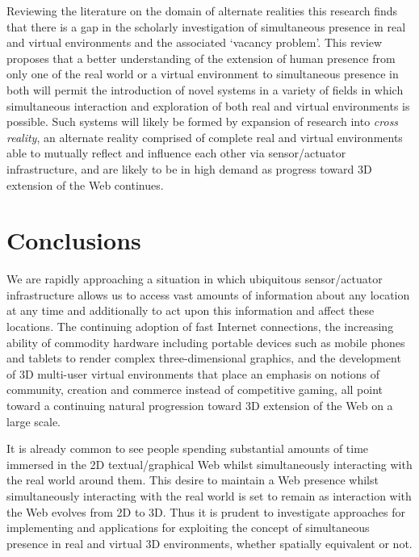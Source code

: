 Reviewing the literature on the domain of alternate realities this research finds that there is a gap in the scholarly investigation of simultaneous presence in real and virtual environments and the associated `vacancy problem'. This review proposes that a better understanding of the extension of human presence from only one of the real world or a virtual environment to simultaneous presence in both will permit the introduction of novel systems in a variety of fields in which simultaneous interaction and exploration of both real and virtual environments is possible. Such systems will likely be formed by expansion of research into \textit{cross reality}, an alternate reality comprised of complete real and virtual environments able to mutually reflect and influence each other via sensor/actuator infrastructure, and are likely to be in high demand as progress toward 3D extension of the Web continues.

\section{Conclusions}
We are rapidly approaching a situation in which ubiquitous sensor/actuator infrastructure allows us to access vast amounts of information about any location at any time and additionally to act upon this information and affect these locations. The continuing adoption of fast Internet connections, the increasing ability of commodity hardware including portable devices such as mobile phones and tablets to render complex three-dimensional graphics, and the development of 3D multi-user virtual environments that place an emphasis on notions of community, creation and commerce instead of competitive gaming, all point toward a continuing natural progression toward 3D extension of the Web on a large scale.

It is already common to see people spending substantial amounts of time immersed in the 2D textual/graphical Web whilst simultaneously interacting with the real world around them. This desire to maintain a Web presence whilst simultaneously interacting with the real world is set to remain as interaction with the Web evolves from 2D to 3D. Thus it is prudent to investigate approaches for implementing and applications for exploiting the concept of simultaneous presence in real and virtual 3D environments, whether spatially equivalent or not.

